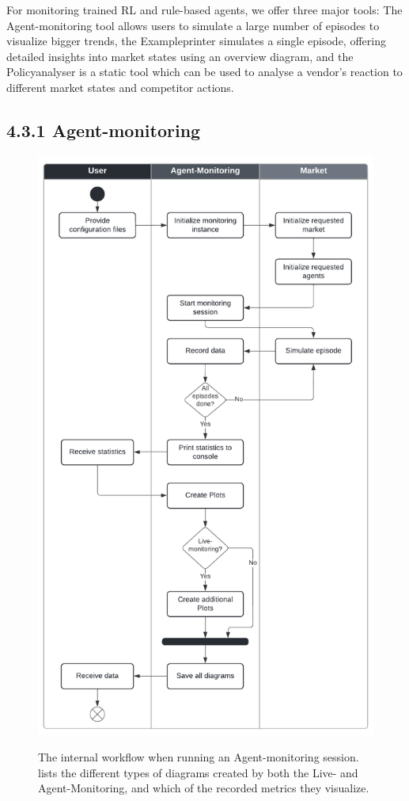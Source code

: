 For monitoring trained RL and rule-based agents, we offer three major tools: The Agent-monitoring tool allows users to simulate a large number of episodes to visualize bigger trends, the Exampleprinter simulates a single episode, offering detailed insights into market states using an overview diagram, and the Policyanalyser is a static tool which can be used to analyse a vendor's reaction to different market states and competitor actions.

\subsection*{4.3.1 Agent-monitoring}\label{subsec:AgentMonitoring}

\begin{figure}
	\centering
	\includegraphics[height = 0.9\textheight]{images/swimlane_monitoring.pdf}\\
	\caption{The internal workflow when running an Agent-monitoring session.  lists the different types of diagrams created by both the Live- and Agent-Monitoring, and which of the recorded metrics they visualize.}\label{fig:SwimlaneMonitoring}
\end{figure}

